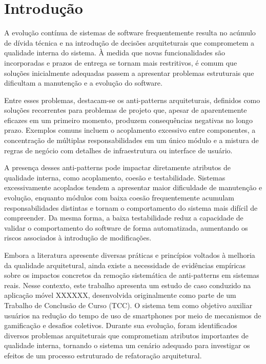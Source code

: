 \documentclass[sigconf,anonymous]{acmart}
\begin{document}
\section{Introdução}

A evolução contínua de sistemas de software frequentemente resulta no acúmulo de dívida técnica e na introdução de decisões arquiteturais que comprometem a qualidade interna do sistema. À medida que novas funcionalidades são incorporadas e prazos de entrega se tornam mais restritivos, é comum que soluções inicialmente adequadas passem a apresentar problemas estruturais que dificultam a manutenção e a evolução do software.

Entre esses problemas, destacam-se os anti-patterns arquiteturais, definidos como soluções recorrentes para problemas de projeto que, apesar de aparentemente eficazes em um primeiro momento, produzem consequências negativas no longo prazo. Exemplos comuns incluem o acoplamento excessivo entre componentes, a concentração de múltiplas responsabilidades em um único módulo e a mistura de regras de negócio com detalhes de infraestrutura ou interface de usuário.

A presença desses anti-patterns pode impactar diretamente atributos de qualidade interna, como acoplamento, coesão e testabilidade. Sistemas excessivamente acoplados tendem a apresentar maior dificuldade de manutenção e evolução, enquanto módulos com baixa coesão frequentemente acumulam responsabilidades distintas e tornam o comportamento do sistema mais difícil de compreender. Da mesma forma, a baixa testabilidade reduz a capacidade de validar o comportamento do software de forma automatizada, aumentando os riscos associados à introdução de modificações.

Embora a literatura apresente diversas práticas e princípios voltados à melhoria da qualidade arquitetural, ainda existe a necessidade de evidências empíricas sobre os impactos concretos da remoção sistemática de anti-patterns em sistemas reais. Nesse contexto, este trabalho apresenta um estudo de caso conduzido na aplicação móvel XXXXXX, desenvolvida originalmente como parte de um Trabalho de Conclusão de Curso (TCC). O sistema tem como objetivo auxiliar usuários na redução do tempo de uso de smartphones por meio de mecanismos de gamificação e desafios coletivos. Durante sua evolução, foram identificados diversos problemas arquiteturais que comprometiam atributos importantes de qualidade interna, tornando o sistema um cenário adequado para investigar os efeitos de um processo estruturado de refatoração arquitetural.
\end{document}
